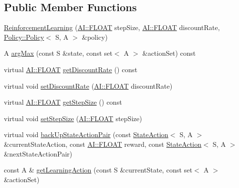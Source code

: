 \subsection*{Public Member Functions}
\begin{DoxyCompactItemize}
\item 
\hyperlink{classAI_1_1Algorithm_1_1ReinforcementLearning_a4d182d91c68aef838b80843acd044b1e}{Reinforcement\+Learning} (\hyperlink{namespaceAI_a41b74884a20833db653dded3918e05c3}{A\+I\+::\+F\+L\+O\+A\+T} step\+Size, \hyperlink{namespaceAI_a41b74884a20833db653dded3918e05c3}{A\+I\+::\+F\+L\+O\+A\+T} discount\+Rate, \hyperlink{classAI_1_1Algorithm_1_1Policy_1_1Policy}{Policy\+::\+Policy}$<$ S, A $>$ \&policy)
\item 
A \hyperlink{classAI_1_1Algorithm_1_1ReinforcementLearning_ad1d8a8ebb47fb71a53b15b770795e286}{arg\+Max} (const S \&state, const set$<$ A $>$ \&action\+Set) const 
\item 
virtual \hyperlink{namespaceAI_a41b74884a20833db653dded3918e05c3}{A\+I\+::\+F\+L\+O\+A\+T} \hyperlink{classAI_1_1Algorithm_1_1ReinforcementLearning_a04edb957e23dde9c6733668ad844c32b}{get\+Discount\+Rate} () const 
\item 
virtual void \hyperlink{classAI_1_1Algorithm_1_1ReinforcementLearning_a1fc1e11a3ddb4377c4d6813a95ce87f4}{set\+Discount\+Rate} (\hyperlink{namespaceAI_a41b74884a20833db653dded3918e05c3}{A\+I\+::\+F\+L\+O\+A\+T} discount\+Rate)
\item 
virtual \hyperlink{namespaceAI_a41b74884a20833db653dded3918e05c3}{A\+I\+::\+F\+L\+O\+A\+T} \hyperlink{classAI_1_1Algorithm_1_1ReinforcementLearning_a13e6c161a33644183d3d357971eeaaf5}{get\+Step\+Size} () const 
\item 
virtual void \hyperlink{classAI_1_1Algorithm_1_1ReinforcementLearning_a04932645faa6c385e4c587f7f845b484}{set\+Step\+Size} (\hyperlink{namespaceAI_a41b74884a20833db653dded3918e05c3}{A\+I\+::\+F\+L\+O\+A\+T} step\+Size)
\item 
virtual void \hyperlink{classAI_1_1Algorithm_1_1ReinforcementLearning_aa45b49ec954f6934df4d541b70076bd6}{back\+Up\+State\+Action\+Pair} (const \hyperlink{classAI_1_1StateAction}{State\+Action}$<$ S, A $>$ \&current\+State\+Action, const \hyperlink{namespaceAI_a41b74884a20833db653dded3918e05c3}{A\+I\+::\+F\+L\+O\+A\+T} reward, const \hyperlink{classAI_1_1StateAction}{State\+Action}$<$ S, A $>$ \&next\+State\+Action\+Pair)
\item 
const A \& \hyperlink{classAI_1_1Algorithm_1_1ReinforcementLearning_a9f31822bf51b07d17b31d7683d7e25a2}{get\+Learning\+Action} (const S \&current\+State, const set$<$ A $>$ \&action\+Set)

\end{DoxyCompactItemize}
